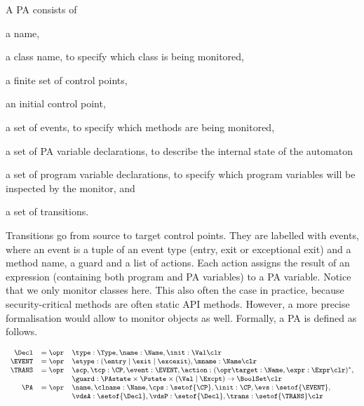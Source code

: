 A PA consists of
\begin{inparaenum}
\item a name,
\item a class name, to specify which class is being monitored,
\item a finite set of control points,
\item an initial control point,
\item a set of events, to specify which methods are being monitored,
\item a set of PA variable declarations, to describe
the internal state of the automaton
\item a set of program variable declarations, to specify which
program variables will be inspected by the monitor, and
\item a set of transitions.
\end{inparaenum}
Transitions go from source to target control points. They are labelled
with events, where an event is a tuple of an event type (entry, exit
or exceptional exit) and a method name, a guard and a list of
actions. Each action assigns the result of an expression (containing
both program and PA variables) to a PA
variable. Notice that we only monitor classes here. This also often
the case in practice, because security-critical methods are often
static API methods. However, a more precise formalisation would allow
to monitor objects as well. Formally, a PA is defined as follows.

\vspace*{-1em}
\[{\small
\begin{array}{rcl}
\Decl & = \opr & \type : \Type, \name : \Name, \init : \Val
\clr \\
\EVENT & = \opr & \etype : (\entry \mid \exit \mid \excexit),
                 \mname : \Name \clr\\
\TRANS & = \opr & \scp, \tcp : \CP, \event : \EVENT, \action : (\opr \target : \Name, \expr : \Expr \clr)^*, \\
& &
\guard : \PAstate \times \Pstate \times (\Val \mid \Excpt) \rightarrow \BoolSet\clr\\
\PA & = \opr & \name, \clname : \Name, \cps : \setof{\CP},
            \init : \CP, \evs : \setof{\EVENT},\\
     &   &  \vdsA : \setof{\Decl}, \vdsP : \setof{\Decl},
            \trans : \setof{\TRANS} \clr
\end{array}}
\]

